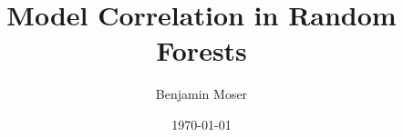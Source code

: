 \documentclass[
    a4paper, %
	fontsize=10pt, %
	twoside=false, %
]{kaobook}
\begin{document}
\begin{titlepage}

\title[Model Correlation in Random Forests]{Model Correlation in Random Forests}
\author[BM]{Benjamin Moser}
\date{\today}


\frontmatter %



	
	
	
	
	
	
	



\end{titlepage}
\end{document}

